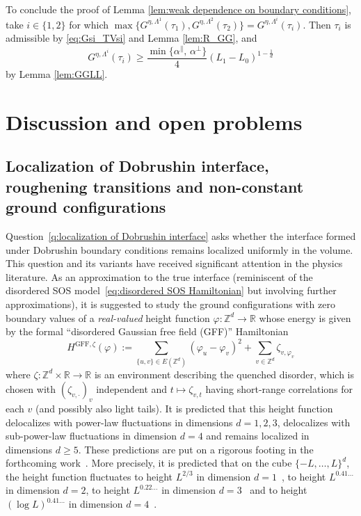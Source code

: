 \documentclass[11pt, reqno]{amsart}
\newcommand{\Z}{\mathbb{Z}}
\newcommand{\R}{\mathbb{R}}
\numberwithin{equation}{section}
\begin{document}
To conclude the proof of Lemma \ref{lem:weak dependence on boundary conditions}, take $i\in\{1,2\}$ for which $\max\{G^{\eta,\Lambda^1}({\tau}_1),G^{\eta,\Lambda^2}({\tau}_2)\}=G^{\eta,\Lambda^i}({\tau}_i)$.
Then ${\tau}_i$ is admissible by \eqref{eq:Gsi_TVsi} and Lemma \ref{lem:R_GG}, and
$$G^{\eta,\Lambda^i}({\tau}_i)\geq\frac{\min\{\alpha^{\parallel},\,\alpha^{\perp}\}}{4}(L_1-L_0)^{1-\frac{1}{d}}$$
by Lemma \ref{lem:GGLL}.

\section{Discussion and open problems}\label{sec:discussion and open problems}

\subsection{Localization of Dobrushin interface, roughening transitions and non-constant ground configurations} Question~\ref{q:localization of Dobrushin interface} asks whether the interface formed under Dobrushin boundary conditions remains localized uniformly in the volume. This question and its variants have received significant attention in the physics literature. 
As an approximation to the true interface (reminiscent of the disordered SOS model~\eqref{eq:disordered SOS Hamiltonian} but involving further approximations), it is suggested to study the ground configurations with zero boundary values of a \emph{real-valued} height function $\varphi:\Z^d\to\R$ whose energy is given by the formal ``disordered Gaussian free field (GFF)'' Hamiltonian
\begin{equation}\label{eq:disordered GFF Hamiltonian}
H^{\text{GFF}, \zeta}(\varphi):=\sum_{\{u,v\}\in E(\Z^d)} (\varphi_u - \varphi_v)^2 + \sum_{v\in\Z^d} \zeta_{v,\varphi_v}
\end{equation}
where $\zeta:\Z^d\times\R\to\R$ is an environment describing the quenched disorder, which is chosen with $(\zeta_{v,\cdot})_v$ independent and $t\mapsto\zeta_{v,t}$ having short-range correlations for each $v$ (and possibly also light tails). It is predicted that this height function delocalizes with power-law fluctuations in dimensions $d=1,2,3$, delocalizes with sub-power-law fluctuations in dimension $d=4$ and remains localized in dimensions $d\ge 5$. These predictions are put on a rigorous footing in the forthcoming work~\cite{DEHP23}. More precisely, it is predicted that on the cube $\{-L,\ldots,L\}^d$, the height function fluctuates to height $L^{2/3}$ in dimension $d=1$~\cites{HH85, HHF85, KN85}, to height $L^{0.41\ldots}$ in dimension $d=2$, to height $L^{0.22\ldots}$ in dimension $d=3$~\cites{F86, M95} and to height $(\log L)^{0.41\ldots}$ in dimension $d=4$~\cite{EN98}.
\end{document}
